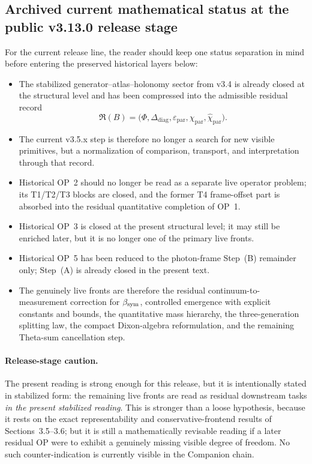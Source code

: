 \subsection*{Archived current mathematical status at the public v3.13.0 release stage}
For the current release line, the reader should keep one status separation in mind before entering the preserved historical layers below:
\begin{itemize}[leftmargin=2em]
  \item The stabilized generator--atlas--holonomy sector from v3.4 is already closed at the structural level and has been compressed into the admissible residual record
  \[
  \mathfrak R(B)=\bigl(\Phi,\Delta_{\mathrm{diag}},\varepsilon_{\mathrm{par}},\chi_{\mathrm{par}},\widehat\chi_{\mathrm{par}}\bigr).
  \]
  \item The current v3.5.x step is therefore no longer a search for new visible primitives, but a normalization of comparison, transport, and interpretation through that record.
  \item Historical OP~2 should no longer be read as a separate live operator problem; its T1/T2/T3 blocks are closed, and the former T4 frame-offset part is absorbed into the residual quantitative completion of OP~1.
  \item Historical OP~3 is closed at the present structural level; it may still be enriched later, but it is no longer one of the primary live fronts.
  \item Historical OP~5 has been reduced to the photon-frame Step~(B) remainder only; Step~(A) is already closed in the present text.
  \item The genuinely live fronts are therefore the residual continuum-to-measurement correction for \(\beta_{\mathrm{sym}}\), controlled emergence with explicit constants and bounds, the quantitative mass hierarchy, the three-generation splitting law, the compact Dixon-algebra reformulation, and the remaining Theta-sum cancellation step.
\end{itemize}

\paragraph{Release-stage caution.}
The present reading is strong enough for this release, but it is intentionally stated in stabilized form: the remaining live fronts are read as residual downstream tasks \emph{in the present stabilized reading}. This is stronger than a loose hypothesis, because it rests on the exact representability and conservative-frontend results of Sections~3.5--3.6; but it is still a mathematically revisable reading if a later residual OP were to exhibit a genuinely missing visible degree of freedom. No such counter-indication is currently visible in the Companion chain.

